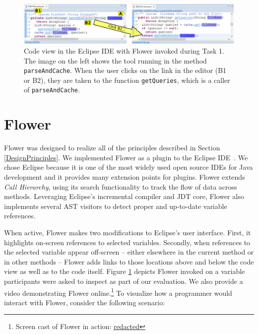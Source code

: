 \documentclass[conference]{IEEEtran}
\begin{document}
\begin{figure}
	\includegraphics[width=\textwidth]{images/toolScreenshot}
	\caption{Code view in the Eclipse IDE with Flower invoked during Task 1. The image on the left shows the tool running in the method \texttt{parseAndCache}. When the user clicks on the link in the editor (B1 or B2), they are taken to the function \texttt{getQueries}, which is a caller of \texttt{parseAndCache}.}	
	\label{fig:tool} 
\end{figure}

\section{Flower}
Flower was designed to realize all of the principles described in Section \ref{DesignPrinciples}. 
We implemented Flower as a plugin to the Eclipse IDE~\cite{Eclipse}. 
We chose Eclipse because it is one of the most widely used open source IDEs for Java development and it provides many extension points for plugins. 
Flower extends \emph{Call Hierarchy}, using its search functionality to track the flow of data across methods. 
Leveraging Eclipse's incremental compiler and JDT core, Flower also implements several AST visitors to detect proper and up-to-date variable references.

When active, Flower makes two modifications to Eclipse's user interface. 
First, it highlights on-screen references to selected variables.
Secondly, when references to the selected variable appear off-screen -- either elsewhere in the current method or in other methods -- Flower adds links to those locations above and below the code view as well as to the code itself. 
Figure \ref{fig:tool} depicts Flower invoked on a variable participants were asked to inspect as part of our evaluation. We also provide a video demonstrating Flower online.\footnote{Screen cast of Flower in action: 
	\url{redacted}}
To visualize how a programmer would interact with Flower, consider the following scenario:
\end{document}
